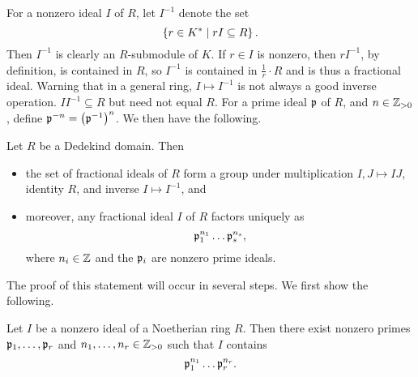 For a nonzero ideal $ I $ of $ R $, let $ I^{-1} $ denote the set
$$ \left\{ r \in K^* \mid rI \subseteq R \right\}. $$
Then $ I^{-1} $ is clearly an $ R $-submodule of $ K $. If $ r \in I $ is nonzero, then $ rI^{-1} $, by definition, is contained in $ R $, so $ I^{-1} $ is contained in $ \tfrac{1}{r} \cdot R $ and is thus a fractional ideal. Warning that in a general ring, $ I \mapsto I^{-1} $ is not always a good inverse operation. $ II^{-1} \subseteq R $ but need not equal $ R $. For a prime ideal $ \mathfrak{p} $ of $ R $, and $ n \in \mathbb{Z}_{> 0} $, define $ \mathfrak{p}^{-n} = \left( \mathfrak{p}^{-1} \right)^n $. We then have the following.

\begin{theorem}
Let $ R $ be a Dedekind domain. Then
\begin{itemize}
\item the set of fractional ideals of $ R $ form a group under multiplication $ I, J \mapsto IJ $, identity $ R $, and inverse $ I \mapsto I^{-1} $, and
\item moreover, any fractional ideal $ I $ of $ R $ factors uniquely as
$$ \mathfrak{p}_1^{n_1} \dots \mathfrak{p}_s^{n_s}, $$
where $ n_i \in \mathbb{Z} $ and the $ \mathfrak{p}_i $ are nonzero prime ideals.
\end{itemize}
\end{theorem}


The proof of this statement will occur in several steps. We first show the following.

\begin{proposition}
Let $ I $ be a nonzero ideal of a Noetherian ring $ R $. Then there exist nonzero primes $ \mathfrak{p}_1, \dots, \mathfrak{p}_r $ and $ n_1, \dots, n_r \in \mathbb{Z}_{> 0} $ such that $ I $ contains
$$ \mathfrak{p}_1^{n_1} \dots \mathfrak{p}_r^{n_r}. $$
\end{proposition}

